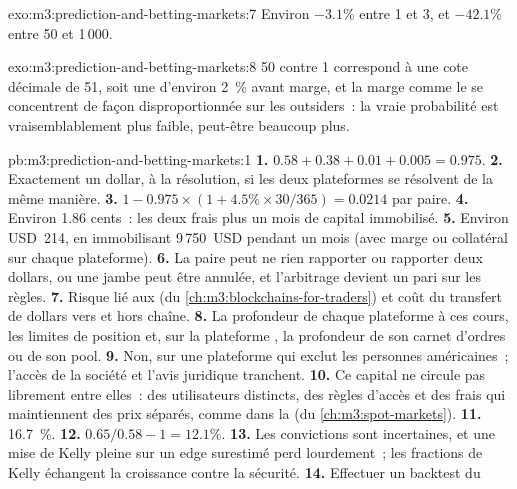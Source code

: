 \begin{solution}{exo:m3:prediction-and-betting-markets:7}
Environ $-3.1\%$ entre 1 et 3, et $-42.1\%$ entre 50 et 1\,000.
\end{solution}

\begin{solution}{exo:m3:prediction-and-betting-markets:8}
50 contre 1 correspond à une cote décimale de 51, soit une  d'environ 2~\% avant marge, et la marge comme le  se concentrent
de façon disproportionnée sur les outsiders~: la vraie probabilité est vraisemblablement plus faible, peut-être beaucoup plus.
\end{solution}

\begin{solution}{pb:m3:prediction-and-betting-markets:1}
\textbf{1.} $0.58 + 0.38 + 0.01 + 0.005 = 0.975$. \textbf{2.} Exactement un dollar, à la résolution, si les deux plateformes se résolvent de la même manière. \textbf{3.} $1 - 0.975
\times (1 + 4.5\% \times 30/365) = 0.0214$ par paire. \textbf{4.} Environ 1.86 cents~: les deux frais plus un mois de capital immobilisé. \textbf{5.} Environ USD~214, en immobilisant
9\,750~USD pendant un mois (avec marge ou collatéral sur chaque plateforme). \textbf{6.} La paire peut ne rien rapporter ou rapporter deux dollars, ou une jambe peut être annulée, et
l'arbitrage devient un pari sur les règles. \textbf{7.} Risque lié aux  (du \cref{ch:m3:blockchains-for-traders}) et coût du transfert de dollars vers et hors chaîne.
\textbf{8.} La profondeur de chaque plateforme à ces cours, les limites de position et, sur la plateforme , la profondeur de son carnet d'ordres ou de son pool. \textbf{9.} Non, sur une plateforme qui
exclut les personnes américaines~; l'accès de la société et l'avis juridique tranchent. \textbf{10.} Ce capital ne circule pas librement entre elles~: des utilisateurs distincts, des règles d'accès
et des frais qui maintiennent des prix séparés, comme dans la  (du \cref{ch:m3:spot-markets}). \textbf{11.} 16.7~\%. \textbf{12.} $0.65/0.58 - 1 = 12.1\%$. \textbf{13.}
Les convictions sont incertaines, et une mise de Kelly pleine sur un edge surestimé perd lourdement~; les fractions de Kelly échangent la croissance contre la sécurité. \textbf{14.} Effectuer un backtest du

\end{solution}
